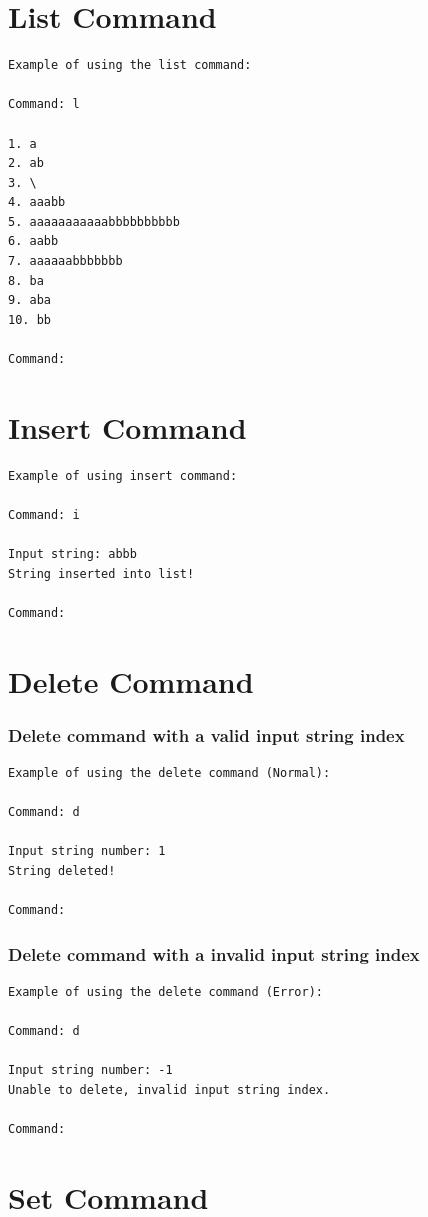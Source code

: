 \documentclass{report}
\begin{document}
     \section{List Command}
     \begin{verbatim}
Example of using the list command:

Command: l

1. a
2. ab
3. \
4. aaabb
5. aaaaaaaaaaabbbbbbbbbb
6. aabb
7. aaaaaabbbbbbb
8. ba
9. aba
10. bb

Command: 
\end{verbatim}
     \section{Insert Command}
\begin{verbatim}
Example of using insert command:

Command: i

Input string: abbb
String inserted into list!
    
Command: 
\end{verbatim}     
     \section{Delete Command}
     \subsubsection{Delete command with a valid input string index}
     \begin{verbatim}
Example of using the delete command (Normal):

Command: d

Input string number: 1
String deleted!

Command: 
\end{verbatim}

\subsubsection{Delete command with a invalid input string index}
\begin{verbatim}
Example of using the delete command (Error):

Command: d

Input string number: -1
Unable to delete, invalid input string index.

Command: 
\end{verbatim}


     \section{Set Command}
     
\end{document}
